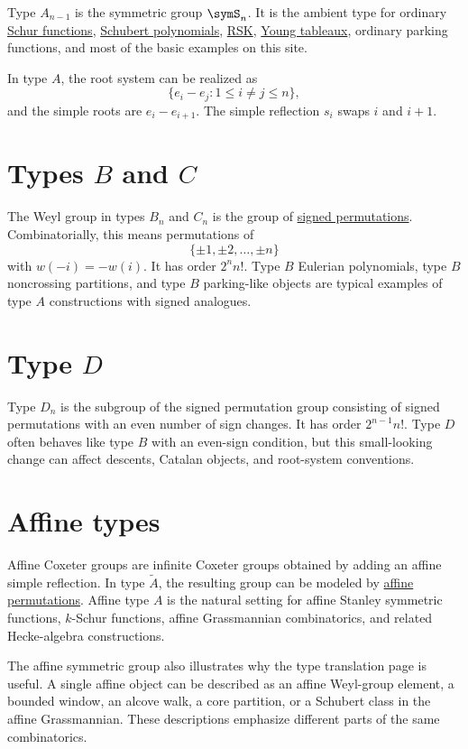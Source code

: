 Type \(A_{n-1}\) is the symmetric group \(\symS_n\).  It is the ambient type
for ordinary \hyperref[schurFunction]{Schur functions},
\hyperref[schubert]{Schubert polynomials}, \hyperref[rskCorrespondence]{RSK},
\hyperref[prelimTableaux]{Young tableaux}, ordinary parking functions, and
most of the basic examples on this site.

In type \(A\), the root system can be realized as
\[
  \{e_i-e_j : 1\leq i\ne j\leq n\},
\]
and the simple roots are \(e_i-e_{i+1}\).  The simple reflection \(s_i\)
swaps \(i\) and \(i+1\).

\section[coxeterTypeB]{Types \(B\) and \(C\)}

The Weyl group in types \(B_n\) and \(C_n\) is the group of
\hyperref[permutationsTypeB]{signed permutations}.  Combinatorially, this
means permutations of
\[
  \{\pm 1,\pm 2,\dotsc,\pm n\}
\]
with \(w(-i)=-w(i)\).  It has order \(2^n n!\).  Type \(B\) Eulerian
polynomials, type \(B\) noncrossing partitions, and type \(B\) parking-like
objects are typical examples of type \(A\) constructions with signed
analogues.

\section[coxeterTypeD]{Type \(D\)}

Type \(D_n\) is the subgroup of the signed permutation group consisting of
signed permutations with an even number of sign changes.  It has order
\(2^{n-1}n!\).  Type \(D\) often behaves like type \(B\) with an even-sign
condition, but this small-looking change can affect descents, Catalan objects,
and root-system conventions.

\section[coxeterAffine]{Affine types}

Affine Coxeter groups are infinite Coxeter groups obtained by adding an
affine simple reflection.  In type \(\widetilde A\), the resulting group can
be modeled by \hyperref[notationAffinePermutations]{affine permutations}.
Affine type \(A\) is the natural setting for affine Stanley symmetric
functions, \(k\)-Schur functions, affine Grassmannian combinatorics, and
related Hecke-algebra constructions.

The affine symmetric group also illustrates why the type translation page is
useful.  A single affine object can be described as an affine Weyl-group
element, a bounded window, an alcove walk, a core partition, or a Schubert
class in the affine Grassmannian.  These descriptions emphasize different
parts of the same combinatorics.
